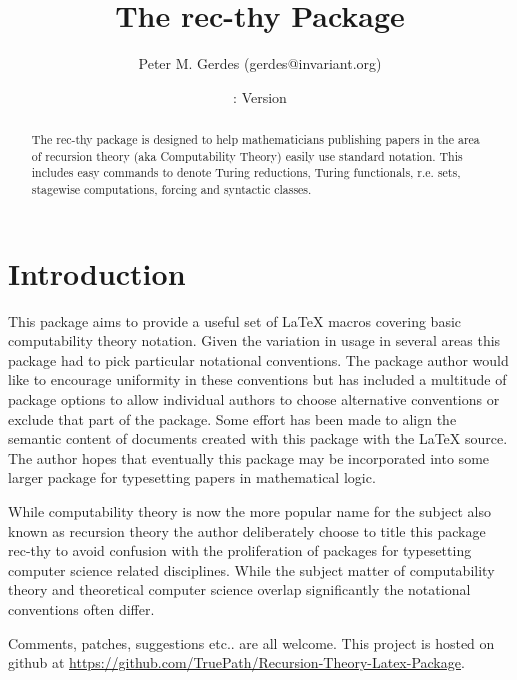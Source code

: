\documentclass[leqno,11pt]{amsart}
\title{The rec-thy Package}
\author{Peter M. Gerdes (gerdes@invariant.org)}
\date{\DateOfPackage{rec-thy}: Version \recthyVersion}
\begin{document}
\begin{abstract}
\noindent The rec-thy package is designed to help mathematicians publishing papers in the area of recursion theory (aka Computability Theory) easily use standard notation.  This includes easy commands to denote Turing reductions, Turing functionals, r.e. sets, stagewise computations, forcing and syntactic classes.
\end{abstract}



\maketitle




\section{Introduction}
This package aims to provide a useful set of \LaTeX { }macros covering basic computability theory notation.  Given the variation in usage in several areas this package had to pick particular notational conventions.  The package author would like to encourage uniformity in these conventions but has included a multitude of package options to allow individual authors to choose alternative conventions or exclude that part of the package.  Some effort has been made to align the semantic content of documents created with this package with the \LaTeX { }source.  The author hopes that eventually this package may be incorporated into some larger package for typesetting papers in mathematical logic.

While computability theory is now the more popular name for the subject also known as recursion theory the author deliberately choose to title this package rec-thy to avoid confusion with the proliferation of packages for typesetting computer science related disciplines.  While the subject matter of computability theory and theoretical computer science overlap significantly the notational conventions often differ.

Comments, patches, suggestions etc.. are all welcome.  This project is hosted on github at \href{https://github.com/TruePath/Recursion-Theory-Latex-Package}{https://github.com/TruePath/Recursion-Theory-Latex-Package}.
\end{document}
